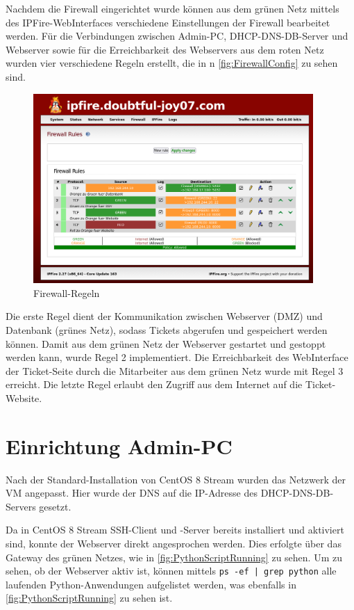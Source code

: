 \documentclass[a4paper,
    11pt,
    headings=small,
    ngerman,
    listof=totoc,
    numbers=noenddot]{scrreprt}[2021/11/13]
\begin{document}
Nachdem die Firewall eingerichtet wurde können aus dem grünen Netz mittels des IPFire-WebInterfaces verschiedene Einstellungen der Firewall
bearbeitet werden. Für die Verbindungen zwischen Admin-PC, \ac{DHCP}-\ac{DNS}-\ac{DB}-Server und Webserver sowie für die Erreichbarkeit des Webservers aus dem roten Netz wurden vier verschiedene Regeln erstellt, die in n \vref{fig:FirewallConfig} zu sehen sind.

\begin{figure}[htbp]
  \centering
  \includegraphics[width=0.95\textwidth]{data/ipfire-config.png}
  \caption{Firewall-Regeln}
  \label{fig:FirewallConfig}
\end{figure}

Die erste Regel dient der Kommunikation zwischen Webserver (\ac{DMZ}) und Datenbank (grünes Netz), sodass Tickets abgerufen und gespeichert werden können. Damit aus dem grünen Netz der Webserver gestartet und gestoppt werden kann, wurde Regel 2 implementiert. Die Erreichbarkeit des WebInterface der Ticket-Seite durch die Mitarbeiter aus dem grünen Netz wurde mit Regel 3 erreicht. Die letzte Regel erlaubt den Zugriff aus dem Internet auf die Ticket-Website.



\section{Einrichtung Admin-PC}

Nach der Standard-Installation von CentOS 8 Stream wurden das Netzwerk der \ac{VM} angepasst. Hier wurde der \ac{DNS} auf die IP-Adresse des \ac{DHCP}-\ac{DNS}-\ac{DB}-Servers gesetzt.

Da in CentOS 8 Stream SSH-Client und -Server bereits installiert und aktiviert sind, konnte der Webserver direkt angesprochen werden. Dies erfolgte über das Gateway des grünen Netzes, wie in \vref{fig:PythonScriptRunning} zu sehen. Um zu sehen, ob der Webserver aktiv ist, können mittels \texttt{ps -ef | grep python} alle laufenden Python-Anwendungen aufgelistet werden, was ebenfalls in \vref{fig:PythonScriptRunning} zu sehen ist.
\end{document}
